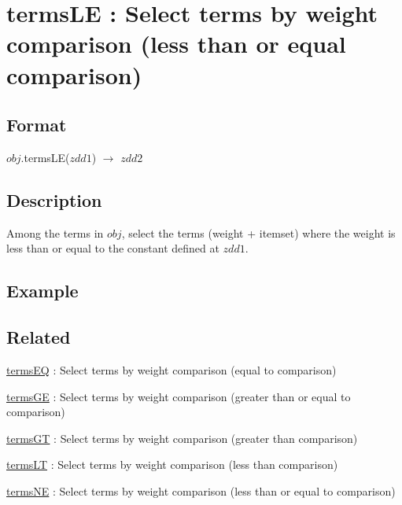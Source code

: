 
\section{termsLE : Select terms by weight comparison (less than or equal comparison)\label{sect:termsLE}}
\subsection*{Format}
$obj$.termsLE($zdd1$) $\rightarrow$ $zdd2$

\subsection*{Description}
Among the terms in $obj$, select the terms (weight + itemset) where the weight is less than or equal to the constant defined at $zdd1$.

\subsection*{Example}


\subsection*{Related}
\hyperref[sect:termsEQ]{termsEQ} : Select terms by weight comparison (equal to comparison)

\hyperref[sect:termsGE]{termsGE} : Select terms by weight comparison (greater than or equal to comparison)

\hyperref[sect:termsGT]{termsGT} : Select terms by weight comparison (greater than comparison)

\hyperref[sect:termsLT]{termsLT} : Select terms by weight comparison (less than comparison)

\hyperref[sect:termsNE]{termsNE} : Select terms by weight comparison (less than or equal to comparison)

